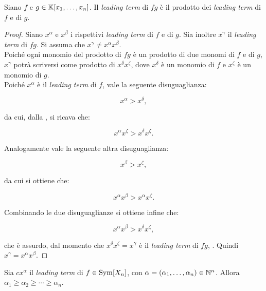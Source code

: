 \begin{proposition}
    \label{prop:leading_term_prodotto}

    Siano $f$ e $g \in \mathbb{K}[x_1, \ldots, x_n]$.
    Il \textit{leading term} di $fg$ è il
    prodotto dei \textit{leading term} di $f$ e di $g$.
\end{proposition}

\begin{proof}
    Siano $x^\alpha$ e $x^\beta$ i rispettivi \textit{leading term}
    di $f$ e di $g$. Sia inoltre $x^\gamma$ il \textit{leading term}
    di $fg$. Si assuma che $x^\gamma \neq x^\alpha x^\beta$. \\
    
    Poiché ogni monomio del prodotto di $fg$ è un prodotto di due
    monomi di $f$ e di $g$, $x^\gamma$ potrà scriversi come
    prodotto di $x^\delta x^\zeta$, dove $x^\delta$ è un monomio
    di $f$ e $x^\zeta$ è un monomio di $g$. \\
    
    Poiché $x^\alpha$ è il \textit{leading term} di $f$, vale
    la seguente disuguaglianza:
    
    \[ x^\alpha > x^\delta, \]
    
    \vskip 0.1in
    
    da cui, dalla , si
    ricava che:
    
    \[ x^\alpha x^\zeta > x^\delta x^\zeta. \]
    
    \vskip 0.1in
    
    Analogamente vale la seguente altra disuguaglianza:
    
    \[ x^\beta > x^\zeta, \]
    
    \vskip 0.1in
    
    da cui si ottiene che:
    
    \[ x^\alpha x^\beta > x^\alpha x^\zeta. \]
    
    \vskip 0.1in
    
    Combinando le due disuguaglianze si ottiene infine che:
    
    \[ x^\alpha x^\beta > x^\delta x^\zeta, \]
    
    \vskip 0.1in
    
    che è assurdo, dal momento che $x^\delta x^\zeta = x^\gamma$ è il \textit{leading
    term} di $fg$, \Lightning{}. Quindi $x^\gamma = x^\alpha x^\beta$.
\end{proof}

\begin{lemma}
    \label{lem:leading_term_simmetrico_disuguaglianza}
    Sia $c x^\alpha$ il \textit{leading term}
    di $f \in \operatorname{Sym}[X_n]$, con $\alpha = (\alpha_1, \ldots, \alpha_n) \in \mathbb N^n$.
    Allora $\alpha_1 \geq \alpha_2 \geq \cdots \geq \alpha_n$.
\end{lemma}

